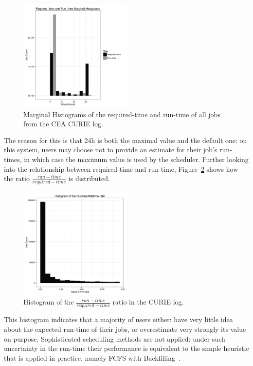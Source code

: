\documentclass{article}
\begin{document}
\begin{figure}[ht]
  \centering
  \includegraphics[width=0.5\textwidth]{reqrun-0.png}
  \caption{Marginal Histograms of the required-time and run-time of all jobs from the CEA CURIE log.}
  \label{fig:_wall_run_for_report_pdf}
\end{figure}

The reason for this is that 24h is both the maximal value and the default one: on this system, users may choose not to provide an estimate for their job's run-times, in which case the maximum value is used by the scheduler.
Further looking into the relationship between required-time and run-time, Figure~\ref{fig:ratio} shows how the ratio $\frac{run-time}{required-time}$ is distributed.

\begin{figure}[ht]
  \centering
  \includegraphics[width=0.5\textwidth]{reqrun-1.png}
  \caption{Histogram of the $\frac{run-time}{required-time}$ ratio in the CURIE log.}
  \label{fig:ratio}
\end{figure}

This histogram indicates that a majority of users either: have very little idea about the expected run-time of their jobs, or overestimate very strongly its value on purpose. Sophisticated scheduling methods are not applied: under such uncertainty in the run-time their performance is equivalent to the simple heuristic that is applied in practice, namely FCFS with Backfilling~\cite{backfilling}.
\end{document}
